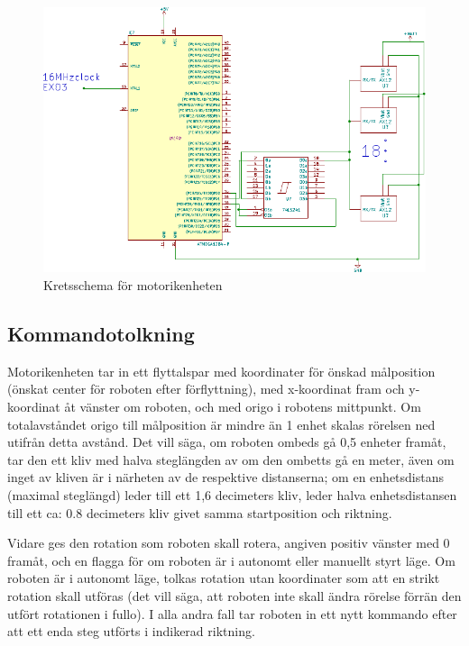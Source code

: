 \documentclass[a4paper,titlepage,12pt]{article}
\begin{document}
	\begin{figure}[htpb]
		\centering
		\includegraphics[width=1.0\linewidth]{charts/motor/motorik.pdf}
		\caption{Kretsschema för motorikenheten}
		\label{fig:motorik}
	\end{figure}
	
		\subsection{Kommandotolkning}
	Motorikenheten  tar in ett flyttalspar med koordinater för önskad målposition (önskat 
	center för roboten efter förflyttning), med x-koordinat fram och 
	y-koordinat åt vänster om roboten, och med origo i robotens mittpunkt. Om totalavståndet 
	origo till målposition är mindre än 1 enhet skalas rörelsen ned utifrån detta avstånd. 
	Det vill säga, om roboten ombeds gå 0,5 enheter framåt, tar den ett kliv med halva 
	steglängden av om den ombetts gå en meter, även om inget av kliven är i närheten av 
	de respektive distanserna; om en enhetsdistans (maximal steglängd) leder till ett 
	1,6 decimeters kliv, leder halva enhetsdistansen till ett ca: 0.8 decimeters kliv givet samma 
	startposition och riktning.
	
	Vidare ges den rotation som roboten 
	skall rotera, angiven positiv vänster med 0 framåt, och en flagga för om 
	roboten är i autonomt eller manuellt styrt läge. Om roboten är i autonomt läge, tolkas 
	rotation utan koordinater som att en strikt rotation skall utföras (det vill säga, att 
	roboten inte skall ändra rörelse förrän den utfört rotationen i fullo). I alla andra fall 
	tar roboten in ett nytt kommando efter att ett enda steg utförts i indikerad riktning. 
	
\end{document}
